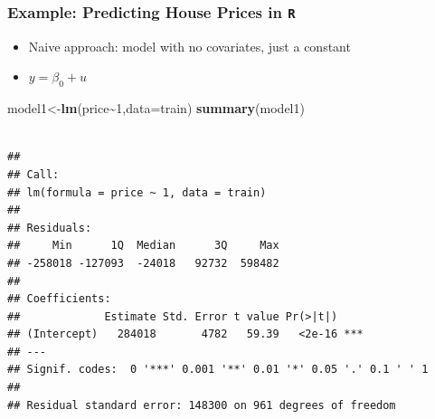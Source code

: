 \documentclass[
  shownotes,
  xcolor={svgnames},
  hyperref={colorlinks,citecolor=DarkBlue,linkcolor=DarkRed,urlcolor=DarkBlue}
  ]{beamer}
\newenvironment{Shaded}{\begin{snugshade}}{\end{snugshade}}
\newcommand{\DataTypeTok}[1]{\textcolor[rgb]{0.13,0.29,0.53}{#1}}
\newcommand{\DecValTok}[1]{\textcolor[rgb]{0.00,0.00,0.81}{#1}}
\newcommand{\KeywordTok}[1]{\textcolor[rgb]{0.13,0.29,0.53}{\textbf{#1}}}
\newcommand{\NormalTok}[1]{#1}
\newcommand{\OperatorTok}[1]{\textcolor[rgb]{0.81,0.36,0.00}{\textbf{#1}}}
\begin{document}
\begin{frame}[fragile]
\frametitle{Example: Predicting House Prices in \texttt{R}}

\begin{itemize}
 \item Naive approach: model with no covariates, just a constant
 \item $y = \beta_0 + u$
\end{itemize}

\begin{Shaded}
\footnotesize
\begin{Highlighting}[]

\NormalTok{model1\textless{}{-}}\KeywordTok{lm}\NormalTok{(price}\OperatorTok{\textasciitilde{}}\DecValTok{1}\NormalTok{,}\DataTypeTok{data=}\NormalTok{train)}
\KeywordTok{summary}\NormalTok{(model1)}
\end{Highlighting}
\end{Shaded}

\begin{tiny}
\begin{verbatim}

## 
## Call:
## lm(formula = price ~ 1, data = train)
## 
## Residuals:
##     Min      1Q  Median      3Q     Max 
## -258018 -127093  -24018   92732  598482 
## 
## Coefficients:
##             Estimate Std. Error t value Pr(>|t|)    
## (Intercept)   284018       4782   59.39   <2e-16 ***
## ---
## Signif. codes:  0 '***' 0.001 '**' 0.01 '*' 0.05 '.' 0.1 ' ' 1
## 
## Residual standard error: 148300 on 961 degrees of freedom
\end{verbatim}
\end{tiny}

\end{frame}
\end{document}

